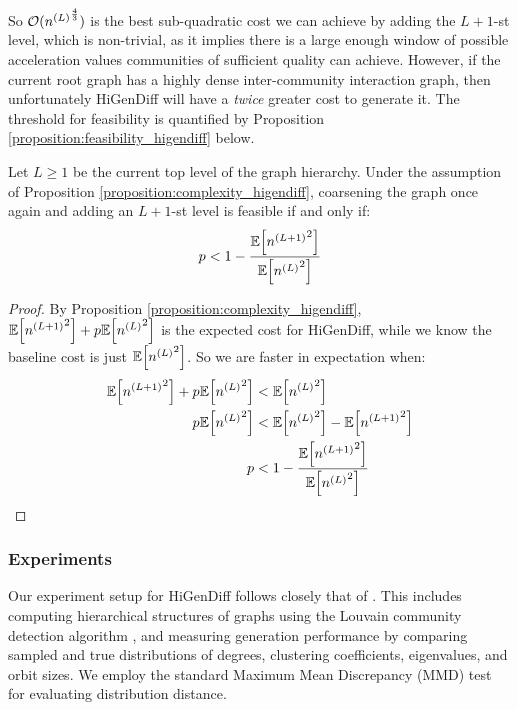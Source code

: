 So $\mathcal{O}({n^{\mathopen{}\left(L\right)}}^{\frac{4}{3}})$ is the best sub-quadratic cost we can achieve by adding the $L+1$-st level, which is non-trivial, as it implies there is a large enough window of possible acceleration values communities of sufficient quality can achieve. However, if the current root graph has a highly dense inter-community interaction graph, then unfortunately HiGenDiff will have a \emph{twice} greater cost to generate it. The threshold for feasibility is quantified by Proposition \ref{proposition:feasibility_higendiff} below.

\begin{proposition}
\label{proposition:feasibility_higendiff}
     Let $L \geq 1$ be the current top level of the graph hierarchy. Under the assumption of Proposition \ref{proposition:complexity_higendiff}, coarsening the graph once again and adding an $L+1$-st level is feasible if and only if:
     \begin{equation}
            p < 1 - \frac{\mathbb{E}\mathopen{}\left[{n^{\mathopen{}\left(L+1\right)}}^2\right]}{\mathbb{E}\mathopen{}\left[{n^{\mathopen{}\left(L\right)}}^2\right]}
     \end{equation}
\end{proposition}
\begin{proof}
    By Proposition \ref{proposition:complexity_higendiff}, $\mathbb{E}\mathopen{}\left[{n^{\mathopen{}\left(L+1\right)}}^2\right] + p \mathbb{E}\mathopen{}\left[{n^{\mathopen{}\left(L\right)}}^2\right]$ is the expected cost for HiGenDiff, while we know the baseline cost is just $\mathbb{E}\mathopen{}\left[{n^{\mathopen{}\left(L\right)}}^2\right]$. So we are faster in expectation when:
    \begin{align}
        \begin{split}
            \mathbb{E}\mathopen{}\left[{n^{\mathopen{}\left(L+1\right)}}^2\right] + p \mathbb{E}\mathopen{}\left[{n^{\mathopen{}\left(L\right)}}^2\right] &< \mathbb{E}\mathopen{}\left[{n^{\mathopen{}\left(L\right)}}^2\right] \\
            p \mathbb{E}\mathopen{}\left[{n^{\mathopen{}\left(L\right)}}^2\right] &< \mathbb{E}\mathopen{}\left[{n^{\mathopen{}\left(L\right)}}^2\right] - \mathbb{E}\mathopen{}\left[{n^{\mathopen{}\left(L+1\right)}}^2\right]  \\
            p &< 1 - \frac{\mathbb{E}\mathopen{}\left[{n^{\mathopen{}\left(L+1\right)}}^2\right]}{\mathbb{E}\mathopen{}\left[{n^{\mathopen{}\left(L\right)}}^2\right]}
        \end{split}
    \end{align}
\end{proof}

\subsubsection{Experiments}

Our experiment setup for HiGenDiff follows closely that of \cite{karami_multi-resolution_2024}. This includes computing hierarchical structures of graphs using the Louvain community detection algorithm \cite{blondel_fast_2008}, and measuring generation performance by comparing sampled and true distributions of degrees, clustering coefficients, eigenvalues, and orbit sizes. We employ the standard Maximum Mean Discrepancy (MMD) test \cite{gretton_kernel_2012} for evaluating distribution distance. 

